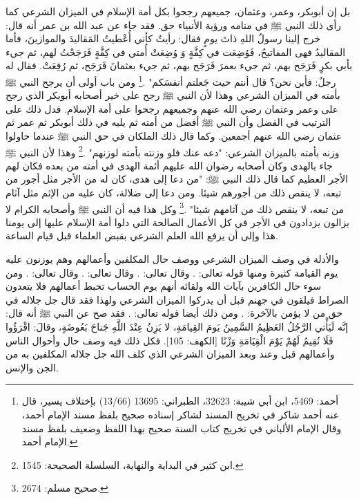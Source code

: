 بل إن أبوبكر، وعمر، وعثمان، جميعهم رجحوا بكل أمة الإسلام في الميزان الشرعي كما رأى ذلك النبي ﷺ في منامه ورؤية الأنبياء حق. فقد جاء عن عبد الله بن عمر أنه قال: خرج إلينا رسولُ اللهِ ذاتَ يومٍ فقال: رأيتُ كأني أُعْطيتُ المَقاليدَ والموازينَ، فأما المقاليدُ فهى المفاتيحُ، فَوُضِعَت في كِفَّةٍ وَ وُضِعَتْ أُمتي في كِفَّةٍ فَرَجَحْتُ لهم، ثم جيء بأبي بكرٍ فَرَجَح بهم، ثم جيء بعمرَ فَرَجَح بهم، ثم جيء بعثمانَ فَرَجَح، ثم رُفِعَتْ. فقال له رجلٌ: فأين نحن؟ قال أنتم حيث جَعلتم أنفسَكم" \href{https://shamela.ws/book/12051/671#p2}{\faExternalLink} \href{https://shamela.ws/book/25794/4217#p1}{\faExternalLink} \cite{albani_Sahiha}.\footnote{أحمد: 5469، ابن أبي شيبة: 32623، الطبراني: 13695 (13/66) بإختلاف يسير، قال عنه أحمد شاكر في تخريج المسند لشاكر إسناده صحيح بلفظ مسند الإمام أحمد، وقال الإمام الألباني في تخريج كتاب السنة صحيح بهذا اللفظ وضعيف بلفظ مسند الإمام أحمد.} ومن باب أولى أن يرجح النبي ﷺ بأمته في الميزان الشرعي وهذا لأن النبي ﷺ رجح على خير أصحابه أبوبكر الذي رجح على وعمر وعثمان رضي الله عنهم وجميعهم رجحوا على  أمة الإسلام. فدل ذلك على الترتيب في الفضل وأن النبي ﷺ أفضل من أمته ثم يليه في ذلك أبوبكر ثم عمر ثم عثمان رضي الله عنهم أجمعين. وكما قال ذلك الملكان في حق النبي ﷺ عندما حاولوا وزنه بأمته بالميزان الشرعي: "دعه عنك فلو وزنته بأمته لوزنهم"  \href{https://shamela.ws/book/9442/2253#p18}{\faExternalLink} \cite{albani_Sahiha}.\footnote{ابن كثير في البداية والنهاية، السلسلة الصحيحة: 1545.} وهذا لأن النبي ﷺ جاء بالهدى وكان أصحابه رضوان الله عليهم أئمة الهدى في أمته من بعده فكان لهم الأجر العظيم كما قال ذلك النبي ﷺ: "من دعا إلى هدى، كان له من الأجر مثل أجور من تبعه، لا ينقص ذلك من أجورهم شيئا. ومن دعا إلى ضلالة، كان عليه من الإثم مثل آثام من تبعه، لا ينقص ذلك من آثامهم شيئا" \href{https://shamela.ws/book/1727/6739#p2}{\faExternalLink} \cite{bukhari}.\footnote{صحيح مسلم: 2674.} وكل هذا فيه أن النبي ﷺ وأصحابه الكرام لا يزالون يزدادون في الأجر في كل الأعمال الصالحة التي دلوا أمة الإسلام عليها إلى يومنا هذا وإلى أن يرفع الله العلم الشرعي بقبض العلماء قبل قيام الساعة. 

والأدلة في وصف الميزان الشرعي ووصف حال المكلفين وأعمالهم وهم يوزنون عليه يوم القيامة كثيرة ومنها قوله تعالى:
\quranayah*[7][8-9]{\footnotesize \surahname*[7]}. وقال تعالى:
\quranayah*[21][47]{\footnotesize \surahname*[21]}. وقال تعالى:
\quranayah*[23][102-103]{\footnotesize \surahname*[23]}. وقال تعالى:
\quranayah*[101][6-9]{\footnotesize \surahname*[101]}. ومن سوء حال الكافرين بآيات الله ولقائه أنهم يوم الحساب تحبط أعمالهم فلا يتعدون الصراط فيلقون في جهنم قبل أن يدركوا الميزان الشرعي ولهذا فقد قال جل جلاله في حق من لا يؤمن بالآخرة: \quranayah*[23][74]{\footnotesize \surahname*[23]}. ومن ذلك أيضا قوله تعالى: \quranayah*[18][105]{\footnotesize \surahname*[18]}. فقد صح عن النبي ﷺ أنه قال: إنَّه لَيَأْتي الرَّجُلُ العَظِيمُ السَّمِينُ يَومَ القِيامَةِ، لا يَزِنُ عِنْدَ اللَّهِ جَناحَ بَعُوضَةٍ، وقالَ: اقْرَؤُوا {فَلَا نُقِيمُ لَهُمْ يَوْمَ الْقِيَامَةِ وَزْنًا} [الكهف: 105]. فكل ذلك فيه وصف حال وأحوال الناس وأعمالهم قبل وعند وبعد الميزان الشرعي الذي كلف الله جل جلاله المكلفين به من الجن والإنس. 

